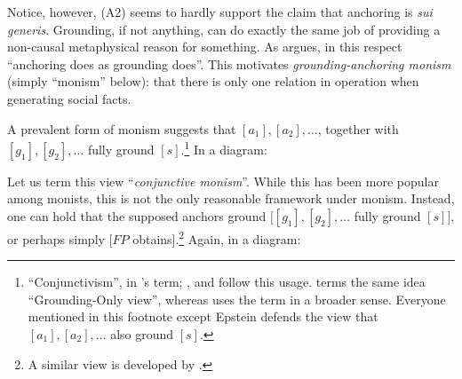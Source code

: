 \documentclass[12pt]{article}
\begin{document}
\par
Notice, however, (A2) seems to hardly support the claim that anchoring is \textit{sui generis}. Grounding, if not anything, can do exactly the same job of providing a non-causal metaphysical reason for something. As \citet{Schaffer2019-SCHAAG-5} argues, in this respect ``anchoring does as grounding does''. This motivates \textit{grounding-anchoring monism} (simply ``monism'' below): that there is only one relation in operation when generating social facts. 

\par
A prevalent form of monism suggests that $[a_1], [a_2], \dots$, together with $[g_1], [g_2], \dots$ fully ground $[s]$.\footnote{``Conjunctivism'', in \citet{Epstein2015-EPSTAT}'s term; \citet{Hawley2019-HAWCOB-4}, \citet{Pagano2023-PAGSCS} and \citet{Chilovi2026-CHIAGA-3} follow this usage. \citet{Schaffer2019-SCHAAG-5} terms the same idea  ``Grounding-Only view'', whereas \citet{Chilovi2026-CHIAGA-3} uses the term in a broader sense. Everyone mentioned in this footnote except Epstein defends the view that $[a_1], [a_2], \dots$ also ground $[s]$.} In a diagram: 

\begin{center}
\end{center}

Let us term this view ``\textit{conjunctive monism}''. While this has been more popular among monists, this is not the only reasonable framework under monism. Instead, one can hold that the supposed anchors ground $[[g_1], [g_2], \dots$ fully ground $[s]]$, or perhaps simply [$FP$ obtains].\footnote{A similar view is developed by \citet{Passinsky2025-PASSCA-2}.} Again, in a diagram:
\end{document}
